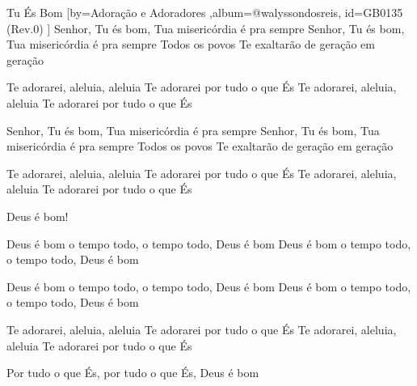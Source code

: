 \beginsong
{Tu És Bom %
}[by={Adoração e Adoradores %
},album={@walyssondosreis},
id={GB0135 %
(Rev.0) %
}]
Senhor, Tu és bom, Tua misericórdia é pra sempre
Senhor, Tu és bom, Tua misericórdia é pra sempre
Todos os povos Te exaltarão de geração em geração

Te adorarei, aleluia, aleluia
Te adorarei por tudo o que És
Te adorarei, aleluia, aleluia
Te adorarei por tudo o que És

Senhor, Tu és bom, Tua misericórdia é pra sempre
Senhor, Tu és bom, Tua misericórdia é pra sempre
Todos os povos Te exaltarão de geração em geração

Te adorarei, aleluia, aleluia
Te adorarei por tudo o que És
Te adorarei, aleluia, aleluia
Te adorarei por tudo o que És

Deus é bom!

Deus é bom o tempo todo, o tempo todo, Deus é bom
Deus é bom o tempo todo, o tempo todo, Deus é bom

Deus é bom o tempo todo, o tempo todo, Deus é bom
Deus é bom o tempo todo, o tempo todo, Deus é bom

Te adorarei, aleluia, aleluia
Te adorarei por tudo o que És
Te adorarei, aleluia, aleluia
Te adorarei por tudo o que És

Por tudo o que És, por tudo o que És, Deus é bom


